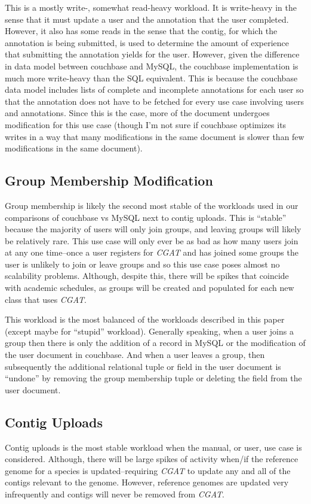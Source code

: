 \documentclass[]{IEEEtran}
\begin{document}
This is a mostly write-, somewhat read-heavy workload. It is write-heavy in the
sense that it must update a user and the annotation that the user completed.
However, it also has some reads in the sense that the contig, for which the
annotation is being submitted, is used to determine the amount of experience
that submitting the annotation yields for the user. However, given the
difference in data model between couchbase and MySQL, the couchbase
implementation is much more write-heavy than the SQL equivalent. This is
because the couchbase data model includes lists of complete and incomplete
annotations for each user so that the annotation does not have to be fetched
for every use case involving users and annotations. Since this is the case,
more of the document undergoes modification for this use case (though I'm not
sure if couchbase optimizes its writes in a way that many modifications in the
same document is slower than few modifications in the same document).

\subsection{Group Membership Modification}
Group membership is likely the second most stable of the workloads used in our
comparisons of couchbase vs MySQL next to contig uploads. This is ``stable''
because the majority of users will only join groups, and leaving groups will
likely be relatively rare. This use case will only ever be as bad as how many
users join at any one time--once a user registers for \textit{CGAT} and has
joined some groups the user is unlikely to join or leave groups and so this use
case poses almost no scalability problems. Although, despite this, there will
be spikes that coincide with academic schedules, as groups will be created and
populated for each new class that uses \textit{CGAT}.

This workload is the most balanced of the workloads described in this paper
(except maybe for ``stupid'' workload). Generally speaking, when a user joins a
group then there is only the addition of a record in MySQL or the modification
of the user document in couchbase. And when a user leaves a group, then
subsequently the additional relational tuple or field in the user document is
``undone'' by removing the group membership tuple or deleting the field from
the user document. 

\subsection{Contig Uploads}
Contig uploads is the most stable workload when the manual, or user, use case
is considered. Although, there will be large spikes of activity when/if the
reference genome for a species is updated--requiring \textit{CGAT} to update
any and all of the contigs relevant to the genome. However, reference genomes
are updated very infrequently and contigs will never be removed from
\textit{CGAT}.
\end{document}
